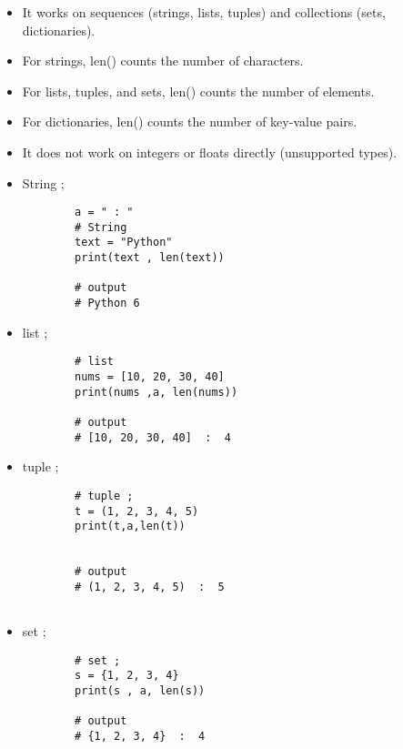 \documentclass[a4paper,11pt]{article}
\theoremstyle{mytheor}
\begin{document}
\begin{itemize}
	\item It works on sequences (strings, lists, tuples) and collections (sets, dictionaries).
	
	\item For strings, len() counts the number of characters.
	
	\item For lists, tuples, and sets, len() counts the number of elements.
	
	\item For dictionaries, len() counts the number of key-value pairs.
	
	\item It does not work on integers or floats directly (unsupported types).
	
	\item String ;
	\begin{lstlisting}
		a = " : "
		# String
		text = "Python"
		print(text , len(text))
		
		# output
		# Python 6
	\end{lstlisting}
	
	\item list ;
	\begin{lstlisting}
		# list
		nums = [10, 20, 30, 40]
		print(nums ,a, len(nums))
		
		# output
		# [10, 20, 30, 40]  :  4
	\end{lstlisting}
	\item tuple ;
	\begin{lstlisting}
		# tuple ;
		t = (1, 2, 3, 4, 5)
		print(t,a,len(t))
		
		
		# output
		# (1, 2, 3, 4, 5)  :  5
		
	\end{lstlisting}
	\item set ;
	\begin{lstlisting}
		# set ;
		s = {1, 2, 3, 4}
		print(s , a, len(s))
		
		# output
		# {1, 2, 3, 4}  :  4
		
	\end{lstlisting}
	
\end{itemize}
\end{document}
